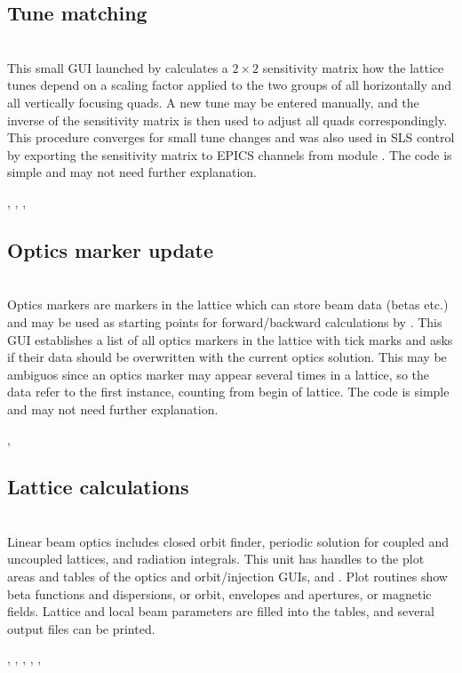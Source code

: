 \documentclass[12pt]{article}
\newcommand\code[1]{{\tt #1}}
\newcommand{\opagui}[1]{\colorbox{blue!20}{{\color{black}\code{#1}}}}
\newcommand{\oguih}[2]{\subsection{\label{#2}#1}{\Huge\opagui{#2}}\\}
\newcommand{\ogui}[1]{\hyperref[#1]{\opagui{#1}}}
\newcommand{\opaguif}[1]{\colorbox{violet!30}{{\color{black}\code{#1}}}}
\newcommand{\oguif}[1]{\hyperref[#1]{\opaguif{#1}}}
\newcommand{\opauni}[1]{\colorbox{orange!30}{{\color{black}\code{#1}}}}
\newcommand{\ounih}[2]{\subsection{\label{#2}#1}{\Huge\opauni{#2}}\\}
\newcommand{\ouni}[1]{\hyperref[#1]{\opauni{#1}}}
\newcommand{\uses}[1]{\flushleft {\bf Uses:} #1}
\newcommand{\desc}[1]{#1}
\begin{document}
\oguih{Tune matching}{otunematrix} 

This small GUI launched by \ogui{opalinop} calculates a $2\times 2$ sensitivity matrix how the lattice tunes depend on a scaling factor applied to the two groups of all horizontally and all vertically focusing quads. A new tune may be entered manually, and the inverse of the sensitivity matrix is then used to adjust all quads correspondingly. This procedure converges for small tune changes and was also used in SLS control by exporting the sensitivity matrix to EPICS channels from module \ogui{opacurrents}. The code is simple and may not need further explanation.

\uses{\ouni{linoplib}, \ouni{globlib}, \ouni{mathlib}, \ouni{../com/asaux}} 


\oguih{Optics marker update}{owriteomrk} 
\desc{Optics markers are markers in the lattice which can store beam data (betas etc.) and may be used as starting points for forward/backward calculations by \ogui{ostartmenu}. This GUI establishes a list of all optics markers in the lattice with tick marks and asks if their data should be overwritten with the current optics solution. This may be ambiguos since an optics marker may appear several times in a lattice, so the data refer to the first instance, counting from begin of lattice. The code is simple and may not need further explanation.}

\uses{\ouni{globlib}, \ouni{../com/asaux}} 




\ounih{Lattice calculations}{linoplib} 

\desc{Linear beam optics includes closed orbit finder, periodic solution for coupled and uncoupled lattices, and radiation integrals. 
This unit has handles to the plot areas and tables of the optics and orbit/injection GUIs, \ogui{opalinop} and \ogui{opaorbit}.
Plot routines show beta functions and dispersions, or orbit, envelopes and apertures, or magnetic fields. Lattice and local beam parameters are filled into the tables, and several output files can be printed. 
}


\uses{
 \ouni{elemlib}, \ogui{opatunediag}, \ouni{globlib}, \ouni{mathlib}, \oguif{../com/vgraph}, \ouni{../com/asaux}}
\end{document}
